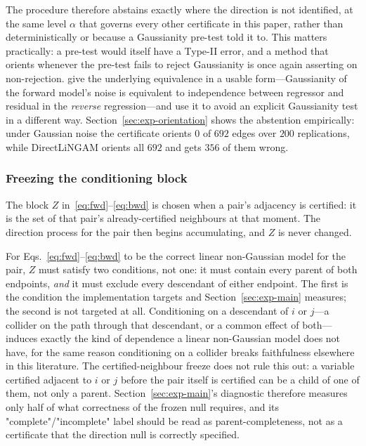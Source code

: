 \documentclass[pdflatex,sn-apa]{sn-jnl}
\theoremstyle{thmstyleone}%
\theoremstyle{thmstyletwo}%
\theoremstyle{thmstylethree}%
\begin{document}
The procedure therefore abstains exactly where the direction is not
identified, at the same level $\alpha$ that governs every other certificate in
this paper, rather than deterministically or because a Gaussianity pre-test
told it to. This matters practically: a pre-test would itself have a Type-II
error, and a method that orients whenever the pre-test fails to reject
Gaussianity is once again asserting on non-rejection.
\citet{ding2025gaussdetect} give the underlying equivalence in a usable
form---Gaussianity of the forward model's noise is equivalent to independence
between regressor and residual in the \emph{reverse} regression---and use it
to avoid an explicit Gaussianity test in a different way.
Section~\ref{sec:exp-orientation} shows the abstention empirically: under
Gaussian noise the certificate orients $0$ of $692$ edges over $200$
replications, while DirectLiNGAM orients all $692$ and gets $356$ of them
wrong.

\subsubsection{Freezing the conditioning block}\label{sec:freezing}

The block $Z$ in~\eqref{eq:fwd}--\eqref{eq:bwd} is chosen when a pair's
adjacency is certified: it is the set of that pair's already-certified
neighbours at that moment. The direction process for the pair then begins
accumulating, and $Z$ is never changed.

For Eqs.~\eqref{eq:fwd}--\eqref{eq:bwd} to be the correct linear
non-Gaussian model for the pair, $Z$ must satisfy two conditions, not one:
it must contain every parent of both endpoints, \emph{and} it must exclude
every descendant of either endpoint. The first is the condition the
implementation targets and Section~\ref{sec:exp-main} measures; the second
is not targeted at all. Conditioning on a descendant of $i$ or $j$---a
collider on the path through that descendant, or a common effect of
both---induces exactly the kind of dependence a linear non-Gaussian model
does not have, for the same reason conditioning on a collider breaks
faithfulness elsewhere in this literature. The certified-neighbour freeze
does not rule this out: a variable certified adjacent to $i$ or $j$ before
the pair itself is certified can be a child of one of them, not only a
parent. Section~\ref{sec:exp-main}'s diagnostic therefore measures only
half of what correctness of the frozen null requires, and its
"complete"/"incomplete" label should be read as parent-completeness, not
as a certificate that the direction null is correctly specified.
\end{document}
